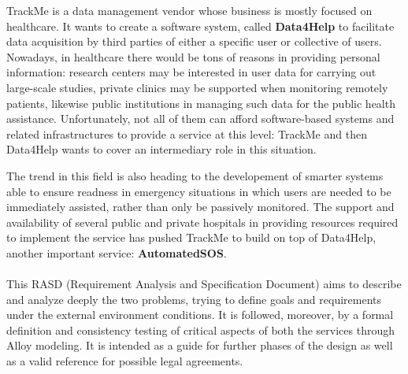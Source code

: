 
\begin{flushleft}
{\raggedright}
TrackMe is a data management vendor whose business is mostly focused on healthcare. It wants to create a software system, called \textbf{Data4Help} to facilitate data acquisition by third parties of either a specific user or collective of users. Nowadays, in healthcare there would be tons of reasons in providing personal information: research centers may be interested in user data for carrying out large-scale studies, private clinics may be supported when monitoring remotely patients, likewise public institutions in managing such data for the public health assistance. Unfortunately, not all of them can afford software-based systems and related infrastructures to provide a service at this level: TrackMe and then Data4Help wants to cover an intermediary role in this situation.\par
The trend in this field is also heading to the developement of smarter systems able to ensure readness in emergency situations in which users are needed to be immediately assisted, rather than only be passively monitored. The support and availability of several public and private hospitals in providing resources required to implement the service has pushed TrackMe to build on top of Data4Help, another important service: \textbf{AutomatedSOS}. \par
\paragraph{}
This RASD (Requirement Analysis and Specification Document) aims to describe and analyze deeply the two problems, trying to define goals and requirements under the external environment conditions. It is followed, moreover, by a formal definition and consistency testing of critical aspects of both the services through Alloy modeling. It is intended as a guide for further phases of the design as well as a valid reference for possible legal agreements.


{}

{}


\end{flushleft}
